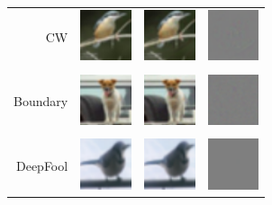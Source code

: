 \documentclass{article}
\begin{document}
\begin{table}[h]
	\centering
	\begin{tabular}{rlll} 
		CW & \includegraphics[height=1.5cm, align=c]{figures/carlini_wagner_orig.pdf} & \includegraphics[height=1.5cm, align=c]{figures/carlini_wagner_adversarial.pdf} & \includegraphics[height=1.5cm, align=c]{figures/carlini_wagner_diff.pdf}\\
		\\
		Boundary & \includegraphics[height=1.5cm, align=c]{figures/boundary_orig.pdf} & \includegraphics[height=1.5cm, align=c]{figures/boundary_adversarial.pdf} & \includegraphics[height=1.5cm, align=c]{figures/boundary_diff.pdf}\\
		\\
		DeepFool & \includegraphics[height=1.5cm, align=c]{figures/deepfool_orig.pdf} & \includegraphics[height=1.5cm, align=c]{figures/deepfool_adversarial.pdf} & \includegraphics[height=1.5cm, align=c]{figures/deepfool_diff.pdf}\\

\end{tabular}
\end{table}
\end{document}
